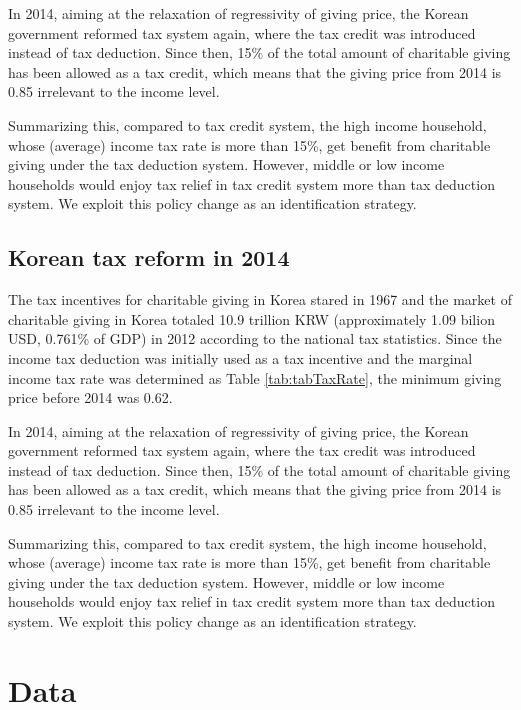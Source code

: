 \documentclass[
]{article}
\begin{document}
In 2014, aiming at the relaxation of regressivity of giving price, the Korean government reformed tax system again, where the tax credit was introduced instead of tax deduction. Since then, 15\% of the total amount of charitable giving has been allowed as a tax credit, which means that the giving price from 2014 is 0.85 irrelevant to the income level.

Summarizing this, compared to tax credit system, the high income household, whose (average) income tax rate is more than 15\%, get benefit from charitable giving under the tax deduction system. However, middle or low income households would enjoy tax relief in tax credit system more than tax deduction system. We exploit this policy change as an identification strategy.

\hypertarget{korean-tax-reform-in-2014}{%
\subsection{Korean tax reform in 2014}\label{korean-tax-reform-in-2014}}

The tax incentives for charitable giving in Korea stared in 1967 and the market of charitable giving in Korea totaled 10.9 trillion KRW (approximately 1.09 bilion USD, 0.761\% of GDP) in 2012 according to the national tax statistics.
Since the income tax deduction was initially used as a tax incentive and the marginal income tax rate was determined as Table \ref{tab:tabTaxRate}, the minimum giving price before 2014 was 0.62.

In 2014, aiming at the relaxation of regressivity of giving price, the Korean government reformed tax system again, where the tax credit was introduced instead of tax deduction. Since then, 15\% of the total amount of charitable giving has been allowed as a tax credit, which means that the giving price from 2014 is 0.85 irrelevant to the income level.

Summarizing this, compared to tax credit system, the high income household, whose (average) income tax rate is more than 15\%, get benefit from charitable giving under the tax deduction system. However, middle or low income households would enjoy tax relief in tax credit system more than tax deduction system. We exploit this policy change as an identification strategy.

\hypertarget{data}{%
\section{Data}\label{data}}
\end{document}
